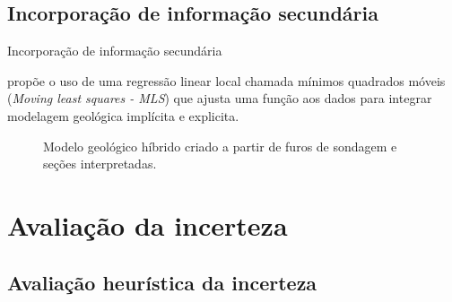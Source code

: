 \documentclass[aspectratio=169]{beamer}
\begin{document}
\subsection{Incorporação de informação secundária}

\begin{frame}{Incorporação de informação secundária}

\cite{manchuck_MLS} propõe o uso de uma regressão linear local chamada mínimos quadrados móveis (\textit{Moving least squares - MLS}) que ajusta uma função aos dados para integrar modelagem geológica implícita e explicita.

	\begin{figure}[H]
		\caption{Modelo geológico híbrido criado a partir de furos de sondagem e seções interpretadas.}\label{mls_model}
	\end{figure}
\end{frame}

\section{Avaliação da incerteza}

\subsection{Avaliação heurística da incerteza}
\end{document}
